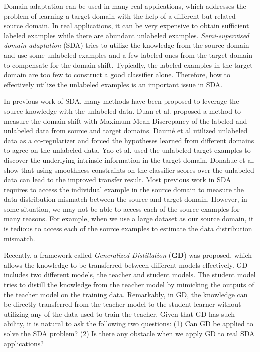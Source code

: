 Domain adaptation can be used in many real applications, which addresses the problem of learning a target domain with the help of a different but related source domain. 
In real applications, it can be very expensive to obtain sufficient labeled examples while there are abundant unlabeled examples. 
\textit{Semi-supervised domain adaptation} (SDA) tries to utilize the knowledge from the source domain and use some unlabeled examples and  a few labeled ones from the target domain to compensate for the domain shift\cite{karl2001long}. Typically, the labeled examples in the target domain are too few to construct a good classifier alone. Therefore, how to effectively utilize the unlabeled examples is an important issue in SDA. 

In previous work of SDA, many methods have been proposed to leverage the source knowledge with the unlabeled data.
Duan et al.\cite{duan2012visual} proposed a method to measure the domain shift with Maximum Mean Discrepancy of the labeled and unlabeled data from source and target domains. Daum{\'e} et al\cite{daume2010frustratingly} utilized unlabeled data as a co-regularizer and forced the hypotheses learned from different domains to agree on the unlabeled data. Yao et al.\cite{yao2015semi} used the unlabeled target examples to discover the underlying intrinsic information in the target domain. Donahue et al.\cite{Donahue_2013_CVPR} show that using smoothness constraints on the classifier scores over the unlabeled data can lead to the improved transfer result.
Most previous work in SDA requires to access the individual example in the source domain to measure the data distribution mismatch between the source and target domain.
However, in some situation, we may not be able to access each of the source examples for many reasons. For example, when we use a large dataset as our source domain, it is tedious to access each of the source examples to estimate the data distribution mismatch.

Recently, a framework called \textit{Generalized Distillation} (\textbf{GD})\cite{lopez2015unifying} was proposed, which allows the knowledge to be transferred between different models effectively. GD includes two different models, the teacher and student models. The student model tries to distill the knowledge from the teacher model by mimicking the outputs of the teacher model on the training data. Remarkably, in GD, the knowledge can be directly transferred from the teacher model to the student learner without utilizing any of the data used to train the teacher.
Given that GD has such ability, it is natural to ask the following two questions: (1) Can GD be applied to solve the SDA problem? (2) Is there any obstacle when we apply GD to real SDA applications?

